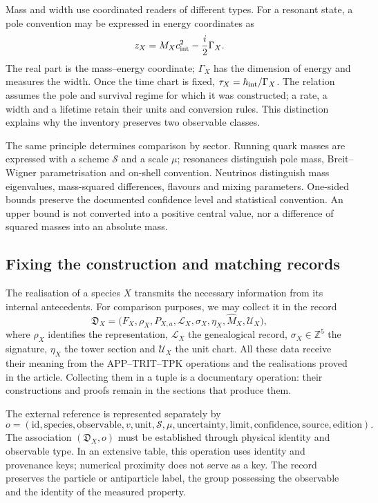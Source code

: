 Mass and width use coordinated readers of different types. For a
resonant state, a pole convention may be expressed in energy
coordinates as
\[
 z_X=M_Xc_{\rm int}^{2}-\frac{i}{2}\Gamma_X.
\]
The real part is the mass--energy coordinate; \(\Gamma_X\) has
the dimension of energy and measures the width. Once the time chart is fixed,
\(\tau_X=\hbar_{\rm int}/\Gamma_X\). The relation assumes the pole
and survival regime for which it was constructed; a rate, a width and
a lifetime retain their units and conversion rules. This
distinction explains why the inventory preserves two observable classes.

The same principle determines comparison by sector. Running quark masses
are expressed with a scheme \(\mathscr S\) and a scale \(\mu\);
resonances distinguish pole mass, Breit--Wigner parametrisation and
on-shell convention. Neutrinos distinguish mass eigenvalues,
mass-squared differences, flavours and mixing parameters. One-sided
bounds preserve the documented confidence level and statistical convention.
An upper bound is not converted into a positive central value,
nor a difference of squared masses into an absolute mass.

\subsection{Fixing the construction and matching records}
\label{subsec:vi-congelacion}

The realisation of a species \(X\) transmits the necessary information
from its internal antecedents. For comparison purposes, we may collect it
in the record
\[
 \mathfrak D_X=
 \bigl(F_X,\rho_X,P_{X,a},\mathcal L_X,
       \sigma_X,\eta_X,\widehat M_X,\mathcal U_X\bigr),
\]
where \(\rho_X\) identifies the representation, \(\mathcal L_X\) the
genealogical record, \(\sigma_X\in\mathbb Z^5\) the signature,
\(\eta_X\) the tower section and \(\mathcal U_X\) the unit
chart. All these data receive their meaning from the
APP--TRIT--TPK operations and the realisations proved in the article. Collecting them
in a tuple is a documentary operation: their constructions and
proofs remain in the sections that produce them.

The external reference is represented separately by
\[
 o=(\mathrm{id},\mathrm{species},\mathrm{observable},
      v,\mathrm{unit},\mathscr S,\mu,
      \mathrm{uncertainty},\mathrm{limit},\mathrm{confidence},
      \mathrm{source},\mathrm{edition}).
\]
The association \((\mathfrak D_X,o)\) must be established through
physical identity and observable type. In an extensive table, this
operation uses identity and provenance keys; numerical proximity
does not serve as a key. The record preserves the
particle or antiparticle label, the group possessing the observable and
the identity of the measured property.

